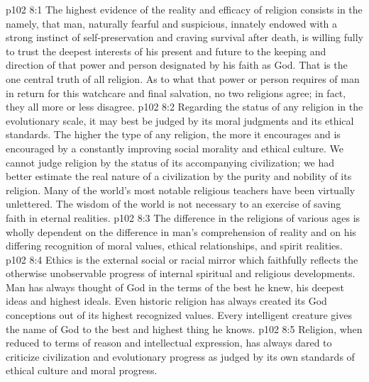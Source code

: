 \vs p102 8:1 The highest evidence of the reality and efficacy of religion consists in the  namely, that man, naturally fearful and suspicious, innately endowed with a strong instinct of self\hyp{}preservation and craving survival after death, is willing fully to trust the deepest interests of his present and future to the keeping and direction of that power and person designated by his faith as God. That is the one central truth of all religion. As to what that power or person requires of man in return for this watchcare and final salvation, no two religions agree; in fact, they all more or less disagree.
\vs p102 8:2 Regarding the status of any religion in the evolutionary scale, it may best be judged by its moral judgments and its ethical standards. The higher the type of any religion, the more it encourages and is encouraged by a constantly improving social morality and ethical culture. We cannot judge religion by the status of its accompanying civilization; we had better estimate the real nature of a civilization by the purity and nobility of its religion. Many of the world’s most notable religious teachers have been virtually unlettered. The wisdom of the world is not necessary to an exercise of saving faith in eternal realities.
\vs p102 8:3 The difference in the religions of various ages is wholly dependent on the difference in man’s comprehension of reality and on his differing recognition of moral values, ethical relationships, and spirit realities.
\vs p102 8:4 \pc Ethics is the external social or racial mirror which faithfully reflects the otherwise unobservable progress of internal spiritual and religious developments. Man has always thought of God in the terms of the best he knew, his deepest ideas and highest ideals. Even historic religion has always created its God conceptions out of its highest recognized values. Every intelligent creature gives the name of God to the best and highest thing he knows.
\vs p102 8:5 Religion, when reduced to terms of reason and intellectual expression, has always dared to criticize civilization and evolutionary progress as judged by its own standards of ethical culture and moral progress.

